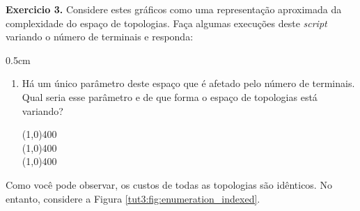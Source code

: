 \begin{refsection}
\begin{blackBlock}{\textbf{Exercicio 3.}}\label{tut3:ex:3.\arabic{ex}}
	Considere estes gráficos como uma representação aproximada da complexidade do espaço de topologias. Faça algumas execuções deste \textit{script} variando o número de terminais e responda:
\begin {myindentpar}{0.5cm}
\begin{enumerate}[\itshape i.]
 \item{Há um único parâmetro deste espaço que é afetado pelo número de terminais. Qual seria esse parâmetro e de que forma o espaço de topologias está variando?}\label{tut3:ex1}\\
  \begin{center}
  \line(1,0){400}\\
  \line(1,0){400}\\
  \line(1,0){400}\\
  \end{center}

\end{enumerate}
\end{myindentpar}

\end{blackBlock}

Como você pode observar, os custos de todas as topologias são idênticos. No entanto, considere a Figura \ref{tut3:fig:enumeration_indexed}.


\end{refsection}
